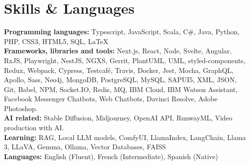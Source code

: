 \documentclass[letterpaper,11pt]{article}
\newcommand{\resumeSubHeadingListStart}{\begin{itemize}[leftmargin=0.15pt, label={}]}
\newcommand{\resumeSubHeadingListEnd}{\end{itemize}}
\begin{document}
\section{Skills \& Languages}
\vspace{2pt}
\resumeSubHeadingListStart
  \small{\item{
      \textbf{Programming languages:}{ Typescript, JavaScript, Scala, C\#, Java, Python, PHP, CSS3, HTML5, SQL, LaTeX} \\ \vspace{3pt}
      \textbf{Frameworks, libraries and tools:}{ Next.js, React, Node, Svelte, Angular, RxJS, Playwright, NestJS, NGXS, Gerrit, PlantUML, UML,
      styled-components, Redux, Webpack, Cypress, Testcafé, Travis, Docker, Jest, Mocha, GraphQL, Apollo, Sass,
      Neo4j, MongoDB, PostgreSQL, MySQL, SAPUI5, XML, JSON, Git, Babel, NPM, Socket.IO, Redis, MQ, IBM Cloud, IBM
      Watson Assistant, Facebook Messenger Chatbots, Web Chatbots, Davinci Resolve, Adobe Photoshop.} \\ \vspace{3pt}
      \textbf{AI related:} {Stable Diffusion, Midjourney, OpenAI API, RunwayML, Video production with AI.} \\ \vspace{3pt}
      \textbf{Learning:}{ RAG, Local LLM models, ComfyUI, LlamaIndex, LangChain, Llama 3, LLaVA, Gemma, Ollama, Vector Databases, FAISS } \\ \vspace{3pt}
      \textbf{Languages:}{ English (Fluent), French (Intermediate), Spanish (Native)} \\ \vspace{3pt}
  }}
\resumeSubHeadingListEnd
\end{document}
